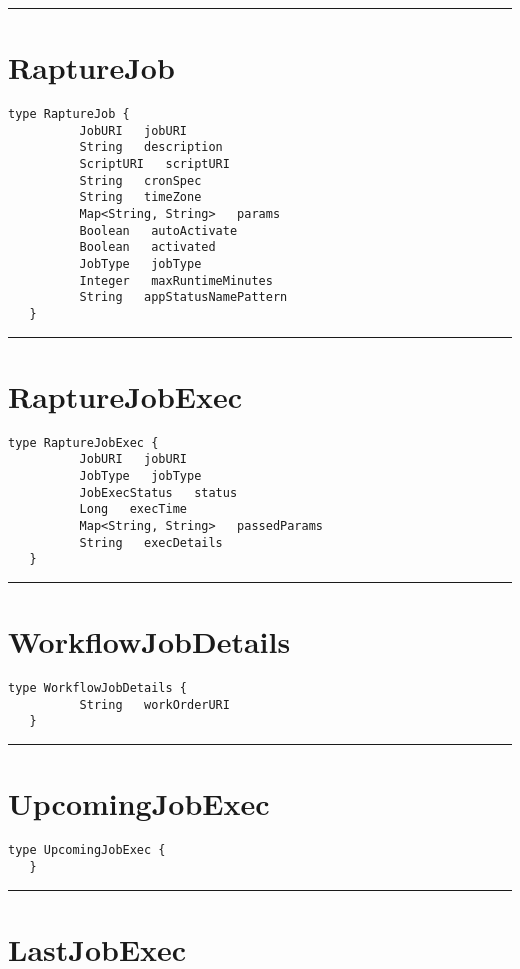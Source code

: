\rule{12cm}{2pt}
\section{RaptureJob}
\label{type:RaptureJob}

\begin{lstlisting}[style=nonumbers]
   type RaptureJob {
          JobURI   jobURI
          String   description
          ScriptURI   scriptURI
          String   cronSpec
          String   timeZone
          Map<String, String>   params
          Boolean   autoActivate
          Boolean   activated
          JobType   jobType
          Integer   maxRuntimeMinutes
          String   appStatusNamePattern
   }
\end{lstlisting}

\rule{12cm}{2pt}
\section{RaptureJobExec}
\label{type:RaptureJobExec}

\begin{lstlisting}[style=nonumbers]
   type RaptureJobExec {
          JobURI   jobURI
          JobType   jobType
          JobExecStatus   status
          Long   execTime
          Map<String, String>   passedParams
          String   execDetails
   }
\end{lstlisting}

\rule{12cm}{2pt}
\section{WorkflowJobDetails}
\label{type:WorkflowJobDetails}

\begin{lstlisting}[style=nonumbers]
   type WorkflowJobDetails {
          String   workOrderURI
   }
\end{lstlisting}

\rule{12cm}{2pt}
\section{UpcomingJobExec}
\label{type:UpcomingJobExec}

\begin{lstlisting}[style=nonumbers]
   type UpcomingJobExec {
   }
\end{lstlisting}

\rule{12cm}{2pt}
\section{LastJobExec}
\label{type:LastJobExec}

